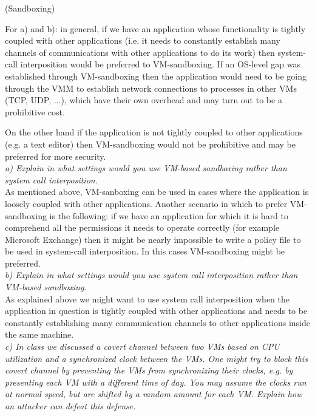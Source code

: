 \begin{prob}  (Sandboxing) 
\end{prob}

\noindent For a) and b): in general, if we have an application whose functionality is tightly coupled with other applications (i.e. it needs to constantly establish many channels of communications with other applications to do its work) then system-call interposition would be preferred to VM-sandboxing. If an OS-level gap was established through VM-sandboxing then the application would need to be going through the VMM to establish network connections to processes in other VMs (TCP, UDP, ...), which have their own overhead and may turn out to be a prohibitive cost.

On the other hand if the application is not tightly coupled to other applications (e.g. a text editor) then VM-sandboxing would not be prohibitive and may be preferred for more security.\\

\noindent \textit{a) Explain in what settings would you use VM-based sandboxing rather than system call interposition.}\\

\noindent  As mentioned above, VM-sanboxing can be used in cases where the application is loosely coupled with other applications. Another scenario in which to prefer VM-sandboxing is the following: if we have an application for which it is hard to comprehend all the permissions it needs to operate correctly (for example Microsoft Exchange) then it might be nearly impossible to write a policy file to be used in system-call interposition. In this cases VM-sandboxing might be preferred.\\

\noindent \textit{b) Explain in what settings would you use system call interposition rather than VM-based sandboxing.}\\

\noindent As explained above we might want to use system call interposition when the application in question is tightly coupled with other applications and needs to be constantly establishing many communication channels to other applications inside the same machine. \\

\noindent \textit{c) In class we discussed a covert channel between two VMs based on CPU utilization and a synchronized clock between the VMs. One might try to block this covert channel by preventing the VMs from synchronizing their clocks, e.g. by presenting each VM with a different time of day. You may assume the clocks run at normal speed, but are shifted by a random amount for each VM. Explain how an attacker can defeat this defense.}\\

